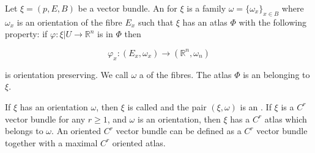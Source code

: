 Let $\xi = (p, E, B)$ be a vector bundle. An  for $\xi$ is a family $\omega = \{\omega_x\}_{x \in B}$ where $\omega_x$ is an orientation of the fibre $E_x$ such that $\xi$ has an atlas $\Phi$ with the following property: if $\varphi: \xi|U \to \mathbb{R}^n$ is in $\Phi$ then

$$\varphi_x: (E_x, \omega_x) \to (\mathbb{R}^n, \omega_n)$$

is orientation preserving. We call $\omega$ a  of the fibres. The atlas $\Phi$ is an  belonging to $\xi$.

If $\xi$ has an orientation $\omega$, then $\xi$ is called  and the pair $(\xi, \omega)$ is an . If $\xi$ is a $C^r$ vector bundle for any $r \geqslant 1$, and $\omega$ is an orientation, then $\xi$ has a $C^r$ atlas which belongs to $\omega$. An oriented $C^r$ vector bundle can be defined as a $C^r$ vector bundle together with a maximal $C^r$ oriented atlas.
